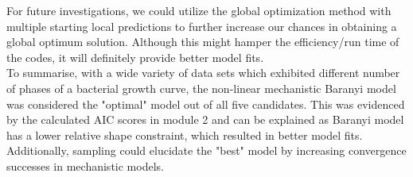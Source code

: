 \documentclass[11pt, a4paper]{article} %
\begin{document}
\noindent For future investigations, we could utilize the global optimization method with multiple starting local predictions to further increase our chances in obtaining a global optimum solution. Although this might hamper the efficiency/run time of the codes, it will definitely provide better model fits. \\

\noindent To summarise, with a wide variety of data sets which exhibited different number of phases of a bacterial growth curve, the non-linear mechanistic Baranyi model was considered the "optimal" model out of all five candidates. This was evidenced by the calculated AIC scores in module 2 and can be explained as Baranyi model has a lower relative shape constraint, which resulted in better model fits. Additionally, sampling could elucidate the "best" model by increasing convergence successes in mechanistic models.

\newpage



\end{document}
